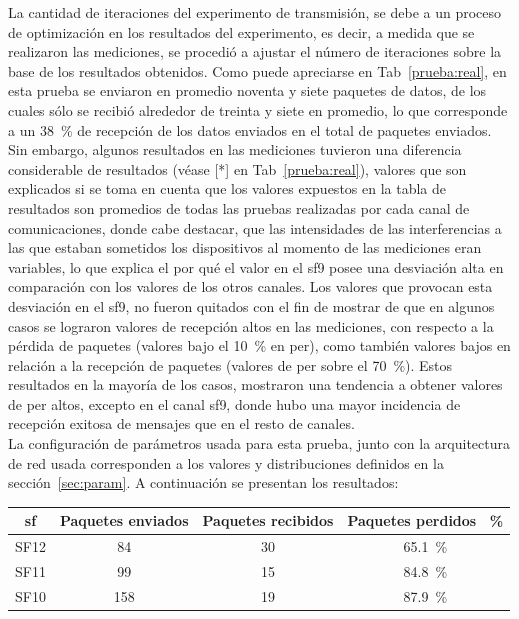 \begin{justify}
La cantidad de iteraciones del experimento de transmisión, se debe a un proceso de optimización en los resultados del experimento, es decir, a medida que se realizaron las mediciones, se procedió a ajustar el número de iteraciones sobre la base de los resultados obtenidos. Como puede apreciarse en Tab~\ref{prueba:real}, en esta prueba se enviaron en promedio noventa y siete paquetes de datos, de los cuales sólo se recibió alrededor de treinta y siete en promedio, lo que corresponde a un \SI{38}{\percent} de recepción de los datos enviados en el total de paquetes enviados. Sin embargo, algunos resultados en las mediciones tuvieron una diferencia considerable de resultados (véase [*] en Tab~\ref{prueba:real}), valores que son explicados si se toma en cuenta que los valores expuestos en la tabla de resultados son promedios de todas las pruebas realizadas por cada canal de comunicaciones, donde cabe destacar, que las intensidades de las interferencias a las que estaban sometidos los dispositivos al momento de las mediciones eran variables, lo que explica el por qué el valor en el \gls{sf}9 posee una desviación alta en comparación con los valores de los otros canales. Los valores que provocan esta desviación en el \gls{sf}9, no fueron quitados con el fin de mostrar de que en algunos casos se lograron valores de recepción altos en las mediciones, con respecto a la pérdida de paquetes (valores bajo el \SI{10}{\percent} en \gls{per}), como también valores bajos en relación a la recepción de paquetes (valores de \gls{per} sobre el \SI{70}{\percent}). Estos resultados en la mayoría de los casos, mostraron una tendencia a obtener valores de \gls{per} altos, excepto en el canal \gls{sf}9, donde hubo una mayor incidencia de recepción exitosa de mensajes que en el resto de canales.\\
La configuración de parámetros usada para esta prueba, junto con la arquitectura de red usada corresponden a los valores y distribuciones definidos en la sección~\ref{sec:param}. A continuación se presentan los resultados:
\begin{table}[!ht]
\centering
\begin{tabular}{|c|c|c|c|}
\hline
\gls{sf} & Paquetes enviados & Paquetes recibidos & Paquetes perdidos \SI{}{\percent} \\ 
\hline
SF12 & 84 & 30 & \SI{65,1}{\percent}\\
\hline
SF11 & 99 & 15 & \SI{84,8}{\percent}\\
\hline
SF10 & 158 & 19 & \SI{87.9}{\percent}\\
\hline

\end{tabular}
\end{table}
\end{justify}
